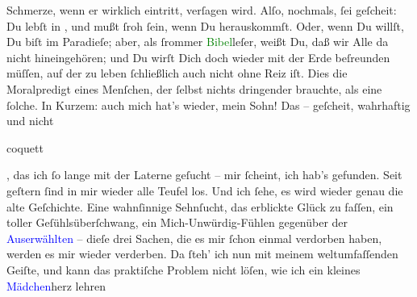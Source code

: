                Schmerze, wenn er wirklich eintritt, verſagen wird. Alſo, nochmals, ſei geſcheit: Du
               lebſt in \label{K_L02649-7v}\label{K_L02649-7h},
               und mußt ſroh ſein, wenn Du herauskommſt. Oder, wenn Du willſt, Du biſt im Paradieſe;
               aber, als ſrommer \textcolor{green}{Bibel}{}\ledrightnote{\textcolor{green}{Bibel}}leſer,  weißt Du, daß wir Alle da nicht hineingehören; und Du wirſt Dich doch wieder
               mit der Erde beſreunden müſſen, auf der zu leben ſchließlich auch nicht ohne Reiz
               iſt.\pend
           \pstart
           Dies die Moralpredigt eines Menſchen, der ſelbst nichts dringender brauchte, als eine
               ſolche. In Kurzem: auch mich hat’s wieder, mein Sohn! Das \label{K_L02649-2v}\label{K_L02649-2h} – geſcheit,
               wahrhaftig und nicht \begin{otherlanguage}{french}coquett\end{otherlanguage}, das ich ſo lange mit
               der Laterne geſucht – mir ſcheint, ich hab’s gefunden. Seit geſtern ſind in mir wieder alle Teufel los. Und ich ſehe, es wird wieder
               genau die alte Geſchichte. Eine wahnſinnige Sehnſucht, das erblickte Glück zu faſſen,
               ein toller Geſühlsüberſchwang, ein Mich-Unwürdig-Fühlen gegenüber der \textcolor{blue}{Auserwählten}{} – dieſe drei
               Sachen, die es mir ſchon einmal verdorben haben, werden es mir wieder verderben. Da
               ſteh’ ich {\pb}nun mit meinem
               weltumfaſſenden Geiſte, und kann das praktiſche Problem nicht löſen, wie ich ein
               kleines \textcolor{blue}{Mädchen}{}herz lehren
